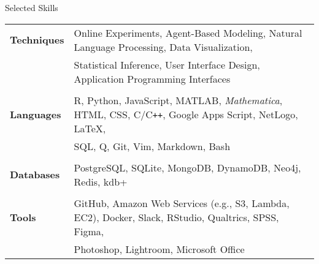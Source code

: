 \documentclass{cv} %
\begin{document}
\begin{cvSection}{Selected Skills}

\begin{tabular}{ @{} >{\bfseries}l @{\hspace{1em}} l }
Techniques &  Online Experiments, Agent-Based Modeling, Natural Language Processing, Data Visualization,
\\
& Statistical Inference, User Interface Design, Application Programming Interfaces
\\\\
Languages &  R, Python, JavaScript, MATLAB, \textit{Mathematica}, HTML, CSS, C/C\texttt{++}, Google Apps Script, NetLogo, \LaTeX{},
\\
& SQL, Q, Git, Vim, Markdown, Bash
\\\\
Databases & PostgreSQL, SQLite, MongoDB, DynamoDB, Neo4j, Redis, kdb+
\\\\
Tools & GitHub, Amazon Web Services (e.g., S3, Lambda, EC2), Docker, Slack, RStudio, Qualtrics, SPSS, Figma,
\\
& Photoshop, Lightroom, Microsoft Office
\end{tabular}

\end{cvSection}
\end{document}
